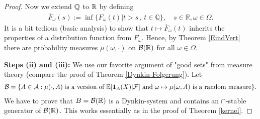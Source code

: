 \begin{proof}[Proof]
			Now we extend $\mathbb{Q}$ to $\mathbb{R}$ by defining
			\begin{align*}
				 \overline{F}_\omega(s):= \inf \big\{ F_\omega(t) \big| t > s \, , \, t \in \mathbb{Q} \big\},\quad s\in \mathbb{R}, \omega \in \Omega.
			\end{align*}
			It is a bit tedious (basic analysis) to show that $t\mapsto \overline F_\omega(t)$ inherits the properties of a distribution function from $F_\omega$. Hence, by Theorem \ref{EindVert} there are probability measures $\mu(\omega,\cdot)$ on $\mathcal B(\mathbb{R})$ for all $\omega\in \Omega$.\smallskip
			
			\textbf{Steps (ii) and (iii):} We use our favorite argument of "{}good sets"{} from measure theory (compare the proof of Theorem \ref{Dynkin-Folgerung}). Let
			\begin{align*}
				\mathcal B=\{ A\in \mathcal A: \mu(\cdot, A)\text{ is a version of }\mathbb{E}[\mathbf 1_{A}(X)|\mathcal F]\text{ and }\omega \mapsto \mu(\omega, A)\text{ is a random measure}\}.
			\end{align*}
			We have to prove that $B=\mathcal B(\mathbb{R})$ is a Dynkin-system and contains an $\cap$-stable generator of $\mathcal B(\mathbb{R})$. This works essentially as in the proof of Theorem \ref{kernel}.
			
			
			
\end{proof}
